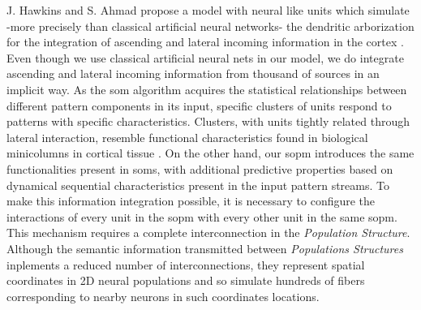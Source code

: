 \documentclass[11pt,a4paper]{article}
\begin{document}
J. Hawkins and S. Ahmad propose a model with neural like units which simulate
-more precisely than classical artificial neural networks- the dendritic arborization
for the integration of ascending and lateral incoming information in the cortex
\cite{hawkins16}.
Even though we use classical artificial neural nets in our model, we do integrate
ascending and lateral incoming information from thousand of sources in an implicit way.
As the \ac{som} algorithm acquires the statistical relationships between different
pattern components in its input, specific clusters of units respond
to patterns with specific characteristics.
Clusters, with units tightly related through lateral interaction,
resemble functional characteristics found in
biological minicolumns in cortical tissue \cite{horton05}.
On the other hand, our \ac{sopm} introduces the same functionalities
present in \ac{som}s, with additional predictive properties
based on dynamical sequential characteristics present in
the input pattern streams.
To make this information integration possible, it is necessary
to configure the interactions of every unit
in the \ac{sopm} with every other unit in the same \ac{sopm}.
This mechanism requires a complete interconnection in the
\textit{Population Structure}.
Although the semantic information transmitted between
\textit{Populations Structures} inplements a reduced number
of interconnections, they represent spatial coordinates
in 2D neural populations and so simulate hundreds of fibers
corresponding to nearby neurons in such coordinates locations.\\
\end{document}
